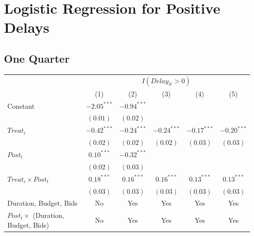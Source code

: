 \documentclass[
]{article}
\begin{document}
\hypertarget{logistic-regression-for-positive-delays}{%
\section{Logistic Regression for Positive
Delays}\label{logistic-regression-for-positive-delays}}

\hypertarget{one-quarter-2}{%
\subsection{One Quarter}\label{one-quarter-2}}

\begin{table}[h]
\begin{center}
\begin{tabular}{l c c c c c}
\hline
 & \multicolumn{5}{c}{$I(Delay_{it}>0)$} \\
\cline{2-6}
 & (1) & (2) & (3) & (4) & (5) \\
\hline
Constant                                   & $-2.05^{***}$ & $-0.94^{***}$ &               &               &               \\
                                           & $(0.01)$      & $(0.02)$      &               &               &               \\
$Treat_i$                                  & $-0.42^{***}$ & $-0.24^{***}$ & $-0.24^{***}$ & $-0.17^{***}$ & $-0.20^{***}$ \\
                                           & $(0.02)$      & $(0.02)$      & $(0.02)$      & $(0.03)$      & $(0.03)$      \\
$Post_t$                                   & $0.10^{***}$  & $-0.32^{***}$ &               &               &               \\
                                           & $(0.02)$      & $(0.03)$      &               &               &               \\
$Treat_i \times Post_t$                    & $0.18^{***}$  & $0.16^{***}$  & $0.16^{***}$  & $0.13^{***}$  & $0.13^{***}$  \\
                                           & $(0.03)$      & $(0.03)$      & $(0.03)$      & $(0.03)$      & $(0.03)$      \\
\hline
Duration, Budget, Bids                     & No            & Yes           & Yes           & Yes           & Yes           \\
$Post_t \times $  (Duration, Budget, Bids) & No            & Yes           & Yes           & Yes           & Yes           \\

\end{tabular}
\end{center}
\end{table}
\end{document}
